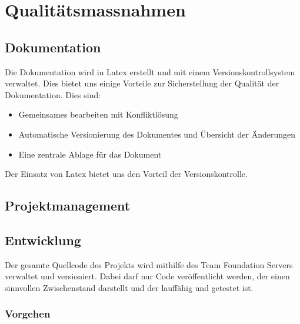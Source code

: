 \chapter{Qualitätsmassnahmen}

\section{Dokumentation}
Die Dokumentation wird in Latex erstellt und mit einem Versionskontrollsystem verwaltet. Dies bietet uns einige Vorteile zur Sicherstellung der Qualität der Dokumentation. Dies sind:
\\\begin{itemize}
    \item Gemeinsames bearbeiten mit Konfliktlösung
    \item Automatische Versionierung des Dokumentes und Übersicht der Änderungen
    \item Eine zentrale Ablage für das Dokument
\end{itemize}
Der Einsatz von Latex bietet uns den Vorteil der Versionskontrolle.


\section{Projektmanagement}

\section{Entwicklung}
Der gesamte Quellcode des Projekts wird mithilfe des Team Foundation Servers verwaltet und versioniert. Dabei darf nur Code veröffentlicht werden, der einen sinnvollen Zwischenstand darstellt und der lauffähig und getestet ist.
\subsection{Vorgehen}

